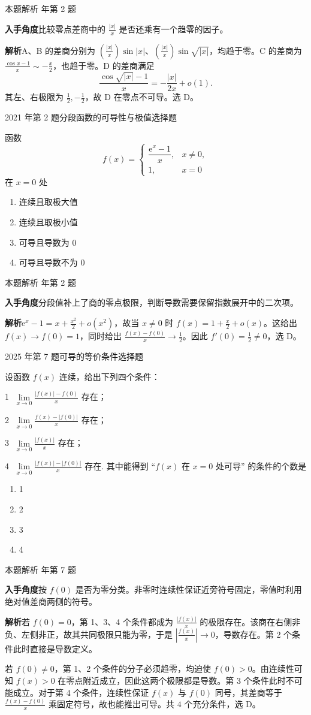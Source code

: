 \documentclass[UTF8,zihao=-4,fontset=fandol]{ctexart}
\renewcommand{\lim}{\operatorname*{lim}\limits}
\newcommand{\circnum}[1]{\textcircled{\scriptsize #1}}
\newenvironment{abcd}{\begin{enumerate}[label=\textup{(\Alph*)},leftmargin=2.3em,itemsep=1pt,topsep=4pt,parsep=1pt]}{\end{enumerate}}
\newcommand{\choices}[4]{%
  \begin{abcd}
    \item #1
    \item #2
    \item #3
    \item #4
  \end{abcd}}
\newcommand{\QuestionPage}[6]{%
  \par\noindent\begin{minipage}{\linewidth}
  \raggedright
  {\small\textcolor{black!60}{#3\quad #5}\hfill\textcolor{accent}{#2}}\par\smallskip}
\newcommand{\QuestionEnd}{\end{minipage}\par\medskip}
\newcommand{\QuestionPage}[6]{%
  \clearpage
  {\small\textcolor{accent}{#1\hfill #2}}\par\medskip
  {\small\textcolor{black!60}{#3\quad #5\hfill #6}}\par\vspace{9bp}}
\newcommand{\QuestionEnd}{}
\newenvironment{QuestionSolution}[1]{%
  \clearpage
  {\small\textcolor{black!60}{本题解析\quad #1}}\par\medskip
}{\par\clearpage}
\begin{document}
\begin{QuestionSolution}{2018 年第 2 题}
\textbf{入手角度}\quad 比较零点差商中的 \(\frac{|x|}{x}\) 是否还乘有一个趋零的因子。

\textbf{解析}\quad A、B 的差商分别为 \((\frac{|x|}{x})\sin|x|\)、\((\frac{|x|}{x})\sin\sqrt{|x|}\)，均趋于零。C 的差商为 \(\frac{\cos x-1}{x}\sim-\frac{x}{2}\)，也趋于零。D 的差商满足
\[
\frac{\cos\sqrt{|x|}-1}{x}=-\frac{|x|}{2x}+o(1).
\]
其左、右极限为 \(\frac{1}{2},-\frac{1}{2}\)，故 D 在零点不可导。选 D。
\end{QuestionSolution}

\QuestionPage{2.1 导数的概念}{选择题}{2021 年第 2 题}{1}{分段函数的可导性与极值}{051 / 234}
函数
\[f(x)=
\begin{cases}
\dfrac{\mathrm{e}^x-1}{x}, & x\ne 0,\\
1, & x=0
\end{cases}
\]
在 \(x=0\) 处
\choices{连续且取极大值}{连续且取极小值}{可导且导数为 \(0\)}{可导且导数不为 \(0\)}
\QuestionEnd

\begin{QuestionSolution}{2021 年第 2 题}
\textbf{入手角度}\quad 分段值补上了商的零点极限，判断导数需要保留指数展开中的二次项。

\textbf{解析}\quad \(\mathrm{e}^x-1=x+\frac{x^2}{2}+o(x^2)\)，故当 \(x\ne0\) 时 \(f(x)=1+\frac{x}{2}+o(x)\)。这给出 \(f(x)\to f(0)=1\)，同时给出 \(\frac{f(x)-f(0)}{x}\to\frac{1}{2}\)。因此 \(f'(0)=\frac{1}{2}\ne0\)，选 D。
\end{QuestionSolution}

\QuestionPage{2.1 导数的概念}{选择题}{2025 年第 7 题}{2}{可导的等价条件}{052 / 234}
设函数 \(f\left( x \right)\) 连续，给出下列四个条件：
\par\circnum{1} \(\lim_{x \to 0} \frac{\left| f\left( x \right) \right| - f\left( 0 \right)}{x}\) 存在；
\par\circnum{2} \(\lim_{x \to 0} \frac{f\left( x \right) - \left| f\left( 0 \right) \right|}{x}\) 存在；
\par\circnum{3} \(\lim_{x \to 0} \frac{\left| f\left( x \right) \right|}{x}\) 存在；
\par\circnum{4} \(\lim_{x \to 0} \frac{\left| f\left( x \right) \right| - \left| f\left( 0 \right) \right|}{x}\) 存在.
其中能得到 “\(f\left( x \right)\) 在 \(x = 0\) 处可导” 的条件的个数是
\choices{1}{2}{3}{4}
\QuestionEnd

\begin{QuestionSolution}{2025 年第 7 题}
\textbf{入手角度}\quad 按 \(f(0)\) 是否为零分类。非零时连续性保证近旁符号固定，零值时利用绝对值差商两侧的符号。

\textbf{解析}\quad 若 \(f(0)=0\)，第 1、3、4 个条件都成为 \(\frac{|f(x)|}{x}\) 的极限存在。该商在右侧非负、左侧非正，故其共同极限只能为零，于是 \(|\frac{f(x)}{x}|\to0\)，导数存在。第 2 个条件此时直接是导数定义。

若 \(f(0)\ne0\)，第 1、2 个条件的分子必须趋零，均迫使 \(f(0)>0\)。由连续性可知 \(f(x)>0\) 在零点附近成立，因此这两个极限都是导数。第 3 个条件此时不可能成立。对于第 4 个条件，连续性保证 \(f(x)\) 与 \(f(0)\) 同号，其差商等于 \(\frac{f(x)-f(0)}{x}\) 乘固定符号，故也能推出可导。共 \(\boxed{4}\) 个充分条件，选 D。
\end{QuestionSolution}
\end{document}
